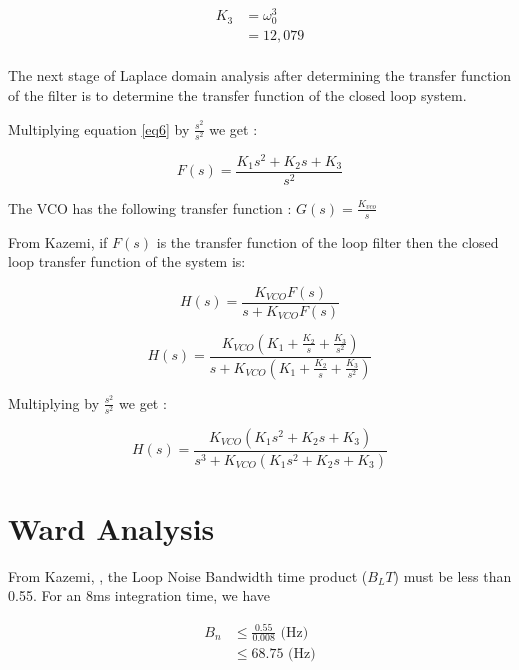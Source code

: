 \begin{equation} \label{eq5}
\begin{split}
K_3 & = \omega_{0}^3\\
    & = 12,079\\
\end{split}
\end{equation}


The next stage of Laplace domain analysis after determining the transfer function of the filter is to determine the transfer function of the closed loop system.

Multiplying equation \ref{eq6} by $\frac{s^2}{s^2}$ we get :

\begin{equation}
F(s) = \frac{K_1s^2 + K_2 s + K_3}{s^2}
\end{equation}

The \ac{VCO} has the following transfer function : $G(s) = \frac{K_{vco}}{s}$

From Kazemi, if  $F(s)$ is the transfer function of the loop filter\cite{KazemiPHD} then the closed loop transfer function  of the system is: 

\begin{equation}
 H(s) = \frac{K_{VCO}F(s)}{s+K_{VCO}F(s)}
\end{equation}

\begin{equation}
 H(s) = \frac{K_{VCO}(K_1 + \frac{K_2}{s} + \frac{K_3}{s^2})}{s+K_{VCO}(K_1 + \frac{K_2}{s} + \frac{K_3}{s^2})}
\end{equation}

Multiplying by $\frac{s^2}{s^2}$ we get :

\begin{equation}
 H(s) = \frac{K_{VCO}(K_1s^2 + K_2s + K_3)}{s^3+K_{VCO}(K_1s^2 + K_2s + K_3)}
 \end{equation}

\section{Ward Analysis}

From Kazemi, \cite{Kazemi2008}, the Loop Noise Bandwidth time product ($B_L T$) must be less than 0.55. 
For an 8ms integration time, we have 

\begin{align*}
B_n &\leq \frac{0.55}{0.008} \text{ (Hz)}\\
    &\leq 68.75 \text{ (Hz)}
\end{align*}


